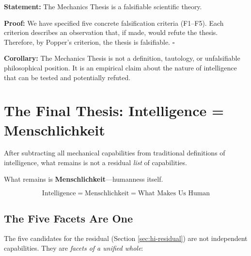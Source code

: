 \begin{tcolorbox}[colback=green!5!white, colframe=green!75!black,
    title=\textbf{Theorem HI-6: Falsifiability}]
\textbf{Statement:} The Mechanics Thesis is a falsifiable scientific theory.

\textbf{Proof:} We have specified five concrete falsification criteria (F1--F5). Each criterion describes an observation that, if made, would refute the thesis. Therefore, by Popper's criterion, the thesis is falsifiable. \hfill $\square$

\textbf{Corollary:} The Mechanics Thesis is not a definition, tautology, or unfalsifiable philosophical position. It is an empirical claim about the nature of intelligence that can be tested and potentially refuted.
\end{tcolorbox}


\section{The Final Thesis: Intelligence = Menschlichkeit}
\label{sec:hi-menschlichkeit}

\begin{tcolorbox}[colback=blue!10!white, colframe=blue!75!black,
    title=\textbf{The Culminating Insight}]

After subtracting all mechanical capabilities from traditional definitions of intelligence, what remains is not a residual \textit{list} of capabilities.

What remains is \textbf{Menschlichkeit}---humanness itself.

\begin{equation}
\boxed{\text{Intelligence} = \text{Menschlichkeit} = \text{What Makes Us Human}}
\end{equation}

\end{tcolorbox}

\subsection{The Five Facets Are One}

The five candidates for the residual (Section \ref{sec:hi-residual}) are not independent capabilities. They are \textit{facets of a unified whole}:

